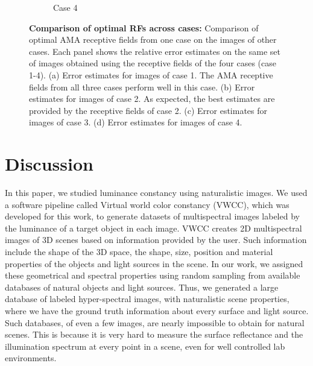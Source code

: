 \documentclass{jov}
\begin{document}
\begin{figure}
\begin{subfigure}{0.22 \textwidth}
	\caption{Case 4}
	\label{fig:case4Bar}
    \end{subfigure}
\caption{{\bf Comparison of optimal RFs across cases:} Comparison of optimal AMA receptive fields from one case on the images of other cases. Each panel shows the relative error estimates on the same set of images obtained using the receptive fields of the four cases (case 1-4). (a) Error estimates for images of case 1. The AMA receptive fields from all three cases perform well in this case. (b) Error estimates for images of case 2. As expected, the best estimates are provided by the receptive fields of case 2. (c) Error estimates for images of case 3. (d) Error estimates for images of case 4.}
 \label{fig:barGraphs}
\end{figure}

\section{Discussion} \label{Discussion}
In this paper, we studied luminance constancy using naturalistic images. We used a software pipeline called  Virtual world color constancy (VWCC), which was developed for this work, to generate datasets of multispectral images labeled by the luminance of a target object in each image. VWCC creates 2D multispectral images of 3D scenes based on information provided by the user. Such information include the shape of the 3D space, the shape, size, position and material properties of the objects and light sources in the scene. In our work, we assigned these geometrical and spectral properties using random sampling from available databases of natural objects and light sources. Thus, we generated a large database of labeled hyper-spectral images, with naturalistic scene properties, where we have the ground truth information about every surface and light source. Such databases, of even a few images, are nearly impossible to obtain for natural scenes. This is because it is very hard to measure the surface reflectance and the illumination spectrum at every point in a scene, even for well controlled lab environments. 
\end{document}
